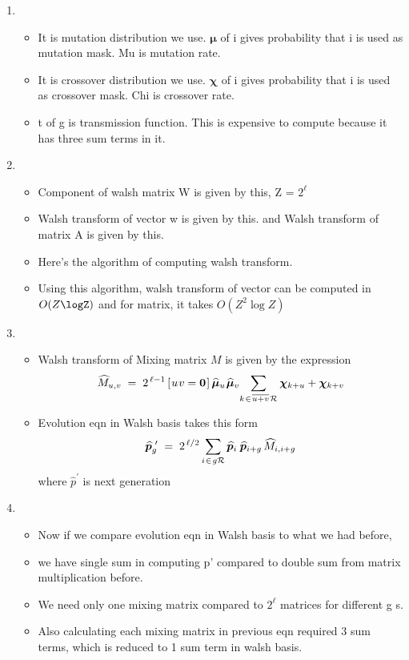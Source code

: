 \documentclass{article}
\newcommand{\nudge}{\hspace{0.01in}}
\begin{document}
\begin{enumerate}
\item
  \begin{itemize}
  \item It is mutation distribution we use. $\bm{\mu}$ of i gives probability that i is used as mutation mask. Mu is mutation rate.
  \item It is crossover  distribution we use. $\bm{\chi}$ of i gives probability that i is used as crossover mask. Chi is crossover rate.
  \item t of g is transmission function. This is expensive to compute because it has three sum terms in it.  
  \end{itemize}
    
\item
  \begin{itemize}
  \item Component of walsh matrix W is given by this, Z = $2^\ell$
  \item Walsh transform of vector w is given by this. 
    and Walsh transform of matrix A is given by this.
  \item Here's the algorithm of computing walsh transform.
  \item Using this algorithm, walsh transform of vector can be computed in $O(Z \logZ)$ and for matrix, it takes $O(Z^2 \log Z)$
  \end{itemize}
  
\item
  \begin{itemize}
  \item Walsh transform of Mixing matrix $M$ is given by the expression
    \[
      \widehat{M}_{u,v} \; = \; 2^{\,\ell-1} \,[\nudge u \nudge v = {\bf
      0}\nudge]\, \widehat{\bm{\mu}}_u \nudge \widehat{\bm{\mu}}_v \!  \sum_{k
    \nudge \in \nudge \overline{u+v} \nudge \mathcal{R}} \bm{\chi}_{k + u} +
    \bm{\chi}_{k + v}
    \]
  \item Evolution eqn in Walsh basis takes this form
  \[
    \widehat{\bm{p}}_g^{\,\,\prime} \; = \; 2^{\,\ell/2} \sum_{i \nudge \in \nudge g \mathcal{R}}
    \widehat{\bm{p}}_i \, \nudge \widehat{\bm{p}}_{i+g} \,\widehat{M}_{i,i+g}
  \]  
  where $\hat{p}^\prime$ is next generation
  \end{itemize}
    
\item
  \begin{itemize}
  \item Now if we compare evolution eqn in Walsh basis to what we had before,
  \item we have single sum in computing p' compared to double sum from matrix multiplication before. 
  \item We need only one mixing matrix compared to $2^\ell$ matrices for different g s.
  \item Also calculating each mixing matrix in previous eqn required 3 sum terms, which is reduced to 1 sum term in walsh basis.   
  \end{itemize}
    

\end{enumerate}
\end{document}
